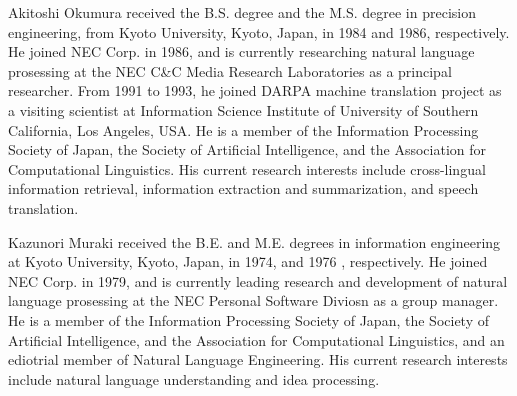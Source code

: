 \begin{biography}

\biotitle{}

{
Akitoshi Okumura received the B.S. degree and the M.S. degree in
precision engineering, from Kyoto University, Kyoto, Japan, in 1984
and 1986, respectively.  He joined NEC Corp. in 1986, and is currently
researching natural language prosessing at the NEC C\&C Media Research
Laboratories as a principal researcher.  From 1991 to 1993, he joined
DARPA machine translation project as a visiting scientist at
Information Science Institute of University of Southern California,
Los Angeles, USA.  He is a member of the Information Processing
Society of Japan, the Society of Artificial Intelligence, and the
Association for Computational Linguistics.  His current research
interests include cross-lingual information retrieval, information
extraction and summarization, and speech translation.
}

{
Kazunori Muraki received the B.E. and M.E. degrees in information
engineering at Kyoto University, Kyoto, Japan, in 1974,
and 1976 , respectively.
He joined NEC Corp. in 1979, and is currently leading
research and development of natural language prosessing at
the NEC Personal Software Diviosn as a group manager.  He is
a member of the Information Processing Society of Japan, the
Society of Artificial Intelligence, and the Association for
Computational Linguistics, and an ediotrial member of
Natural Language Engineering.
His current research interests include natural language
understanding and idea processing.
}



\end{biography}




